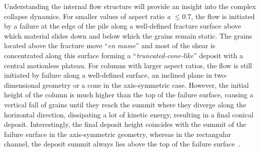 Understanding the internal flow structure will provide an insight into the 
complex collapse dynamics. For smaller values of aspect ratio \textit{a} $\le 
0.7$, the flow is initiated by a failure at the edge of the pile along a 
well-defined fracture surface above which material slides down and below which 
the grains remain static. The grains located above the fracture move 
``\textit{en masse}'' and most of the shear is concentrated along this surface 
forming a ``\textit{truncated-cone-like}'' deposit with a central motionless 
plateau. For columns with larger aspect ratios, the flow is still initiated by 
failure along a well-defined surface, an inclined plane in two-dimensional 
geometry or a cone in the axis-symmetric case. However, the initial height of 
the column is much higher than the top of the failure surface, causing a 
vertical fall of grains until they reach the summit where they diverge along 
the horizontal direction, dissipating a lot of kinetic energy, resulting in a 
final conical deposit. Interestingly, the final deposit height coincides with 
the summit of the failure surface in the axis-symmetric geometry, whereas in 
the rectangular channel, the deposit summit always lies above the top of the 
failure surface~\citep{Lajeunesse2005}. 

